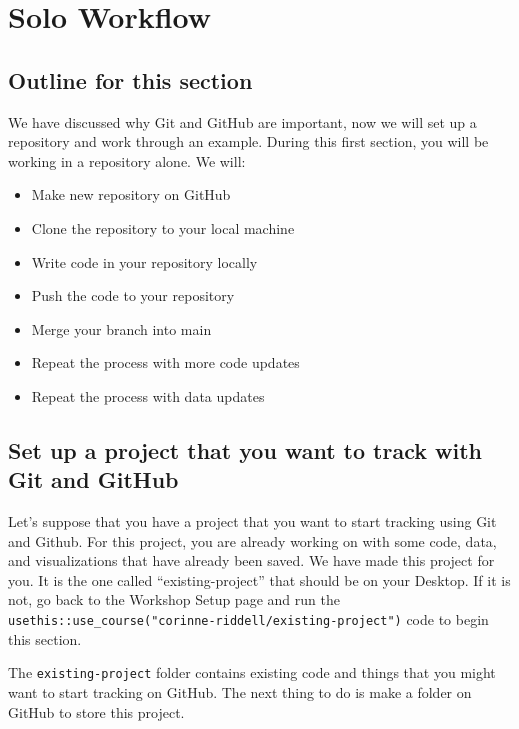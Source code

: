 \documentclass[
]{book}
\providecommand{\tightlist}{%
  \setlength{\itemsep}{0pt}\setlength{\parskip}{0pt}}
\begin{document}
\chapter{Solo Workflow}\label{solo-workflow}

\section{Outline for this section}\label{outline-for-this-section}

We have discussed why Git and GitHub are important, now we will set up a repository and work through an example. During this first section, you will be working in a repository alone. We will:

\begin{itemize}
\tightlist
\item
  Make new repository on GitHub\\
\item
  Clone the repository to your local machine\\
\item
  Write code in your repository locally\\
\item
  Push the code to your repository\\
\item
  Merge your branch into main
\item
  Repeat the process with more code updates
\item
  Repeat the process with data updates
\end{itemize}

\section{Set up a project that you want to track with Git and GitHub}\label{set-up-a-project-that-you-want-to-track-with-git-and-github}

Let's suppose that you have a project that you want to start tracking using Git
and Github. For this project, you are already working on with some code, data,
and visualizations that have already been saved. We have made this project for you.
It is the one called ``existing-project'' that should be on your Desktop. If it is
not, go back to the Workshop Setup page and run the \texttt{usethis::use\_course("corinne-riddell/existing-project")} code to begin this section.

The \texttt{existing-project} folder contains existing code and things that you might
want to start tracking on GitHub. The next thing to do is make a folder on
GitHub to store this project.
\end{document}
